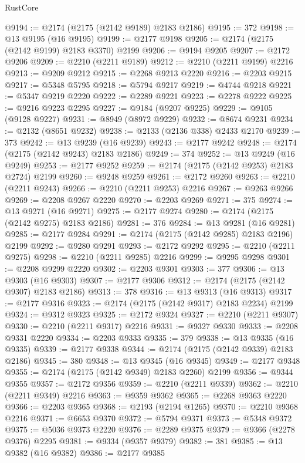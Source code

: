 \begin{lexlean}{RustCore}
\begin{coremodule}
@9194 := @2174 (@2175 (@2142 @9189) @2183 @2186)
@9195 := 372
@9198 := @13 @9195 (@16 @9195)
@9199 := @2177 @9198
@9205 := @2174 (@2175 (@2142 @9199) @2183 @3370) @2199
@9206 := @9194 @9205
@9207 := @2172 @9206
@9209 := @2210 (@2211 @9189)
@9212 := @2210 (@2211 @9199) @2216
@9213 := @9209 @9212
@9215 := @2268 @9213 @2220
@9216 := @2203 @9215
@9217 := @5348 @5795
@9218 := @5794 @9217
@9219 := @4744 @9218
@9221 := @5347 @9219 @2220
@9222 := @2289 @9221
@9223 := @2278 @9222
@9225 := @9216 @9223 @2295
@9227 := @9184 (@9207 @9225)
@9229 := @9105 (@9128 @9227)
@9231 := @8949 (@8972 @9229)
@9232 := @8674 @9231
@9234 := @2132 (@8651 @9232)
@9238 := @2133 (@2136 @338) @2433 @2170
@9239 := 373
@9242 := @13 @9239 (@16 @9239)
@9243 := @2177 @9242
@9248 := @2174 (@2175 (@2142 @9243) @2183 @2186)
@9249 := 374
@9252 := @13 @9249 (@16 @9249)
@9253 := @2177 @9252
@9259 := @2174 (@2175 (@2142 @9253) @2183 @2724) @2199
@9260 := @9248 @9259
@9261 := @2172 @9260
@9263 := @2210 (@2211 @9243)
@9266 := @2210 (@2211 @9253) @2216
@9267 := @9263 @9266
@9269 := @2208 @9267 @2220
@9270 := @2203 @9269
@9271 := 375
@9274 := @13 @9271 (@16 @9271)
@9275 := @2177 @9274
@9280 := @2174 (@2175 (@2142 @9275) @2183 @2186)
@9281 := 376
@9284 := @13 @9281 (@16 @9281)
@9285 := @2177 @9284
@9291 := @2174 (@2175 (@2142 @9285) @2183 @2196) @2199
@9292 := @9280 @9291
@9293 := @2172 @9292
@9295 := @2210 (@2211 @9275)
@9298 := @2210 (@2211 @9285) @2216
@9299 := @9295 @9298
@9301 := @2208 @9299 @2220
@9302 := @2203 @9301
@9303 := 377
@9306 := @13 @9303 (@16 @9303)
@9307 := @2177 @9306
@9312 := @2174 (@2175 (@2142 @9307) @2183 @2186)
@9313 := 378
@9316 := @13 @9313 (@16 @9313)
@9317 := @2177 @9316
@9323 := @2174 (@2175 (@2142 @9317) @2183 @2234) @2199
@9324 := @9312 @9323
@9325 := @2172 @9324
@9327 := @2210 (@2211 @9307)
@9330 := @2210 (@2211 @9317) @2216
@9331 := @9327 @9330
@9333 := @2208 @9331 @2220
@9334 := @2203 @9333
@9335 := 379
@9338 := @13 @9335 (@16 @9335)
@9339 := @2177 @9338
@9344 := @2174 (@2175 (@2142 @9339) @2183 @2186)
@9345 := 380
@9348 := @13 @9345 (@16 @9345)
@9349 := @2177 @9348
@9355 := @2174 (@2175 (@2142 @9349) @2183 @2260) @2199
@9356 := @9344 @9355
@9357 := @2172 @9356
@9359 := @2210 (@2211 @9339)
@9362 := @2210 (@2211 @9349) @2216
@9363 := @9359 @9362
@9365 := @2268 @9363 @2220
@9366 := @2203 @9365
@9368 := @2193 (@2194 @1265)
@9370 := @2210 @9368 @2216
@9371 := @6653 @9370
@9372 := @5794 @9371
@9373 := @5348 @9372
@9375 := @5036 @9373 @2220
@9376 := @2289 @9375
@9379 := @9366 (@2278 @9376) @2295
@9381 := @9334 (@9357 @9379)
@9382 := 381
@9385 := @13 @9382 (@16 @9382)
@9386 := @2177 @9385

\end{coremodule}
\end{lexlean}
